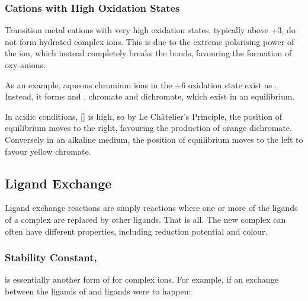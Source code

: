 			\subsubsection{Cations with High Oxidation States}

				Transition metal cations with very high oxidation states, typically above +3, do not form hydrated complex ions. This is due
				to the extreme polarising power of the ion, which instead completely breaks the  bonds, favouring the formation of
				oxy-anions.

				As an example, aqueous chromium ions in the +6 oxidation state  exist as . Instead, it
				forms  and , chromate and dichromate, which exist in an equilibrium.


				In acidic conditions, [] is high, so by Le Châtelier's Principle, the position of equilibrium moves to the right,
				favouring the production of orange dichromate. Conversely in an alkaline medium, the position of equilibrium moves to the left
				to favour yellow chromate.




		\pagebreak
		\subsection{Ligand Exchange}

			Ligand exchange reactions are simply reactions where one or more of the ligands of a complex are replaced by other ligands. That
			is all. The new complex can often have different properties, including reduction potential and colour.

			\subsubsection{Stability Constant, \MKstab{}}

				\Kstab{} is essentially another form of \Kc{} for complex ions. For example, if an exchange between the  ligands of
				 and \ch{\Cl-} ligands were to happen:


